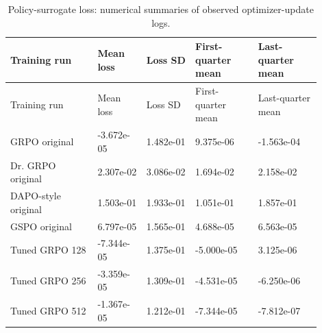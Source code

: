 \documentclass[10pt,letterpaper]{article}
\begin{document}
\begingroup\footnotesize\setlength{\tabcolsep}{3pt}
\begin{longtable}{>{\raggedright\arraybackslash}p{0.2520\linewidth}>{\raggedright\arraybackslash}p{0.1440\linewidth}>{\raggedright\arraybackslash}p{0.1440\linewidth}>{\raggedright\arraybackslash}p{0.1800\linewidth}>{\raggedright\arraybackslash}p{0.1800\linewidth}}
\caption{Policy-surrogate loss: numerical summaries of observed optimizer-update logs.}\\
\toprule Training run & Mean loss & Loss SD & First-quarter mean & Last-quarter mean \\
\midrule\endfirsthead
\toprule Training run & Mean loss & Loss SD & First-quarter mean & Last-quarter mean \\
\midrule\endhead
\midrule\multicolumn{5}{r}{Continued on next page}\endfoot
\bottomrule\endlastfoot
GRPO original & -3.672e-05 & 1.482e-01 & 9.375e-06 & -1.563e-04 \\
Dr. GRPO original & 2.307e-02 & 3.086e-02 & 1.694e-02 & 2.158e-02 \\
DAPO-style original & 1.503e-01 & 1.933e-01 & 1.051e-01 & 1.857e-01 \\
GSPO original & 6.797e-05 & 1.565e-01 & 4.688e-05 & 6.563e-05 \\
Tuned GRPO 128 & -7.344e-05 & 1.375e-01 & -5.000e-05 & 3.125e-06 \\
Tuned GRPO 256 & -3.359e-05 & 1.309e-01 & -4.531e-05 & -6.250e-06 \\
Tuned GRPO 512 & -1.367e-05 & 1.212e-01 & -7.344e-05 & -7.812e-07 \\
\end{longtable}\endgroup
\end{document}
